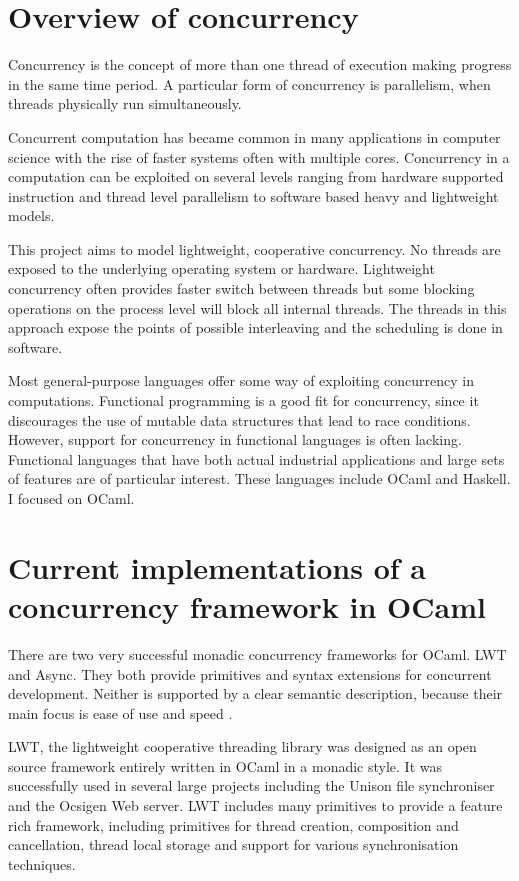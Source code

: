 \documentclass[12pt,twoside,notitlepage]{report}
\theoremstyle{plain}%
\theoremstyle{definition}
\theoremstyle{remark}
\begin{document}
\section{Overview of concurrency}
Concurrency is the concept of more than one thread of execution making progress in the same time period. A particular form of concurrency is parallelism, when threads physically run simultaneously.

Concurrent computation has became common in many applications in computer science with the rise of faster systems often with multiple cores. Concurrency in a computation can be exploited on several levels ranging from hardware supported instruction and thread level parallelism to software based heavy and lightweight models. 

This project aims to model lightweight, cooperative concurrency. No threads are exposed to the underlying operating system or hardware. Lightweight concurrency often provides faster switch between threads  but some blocking operations on the process level will block all internal threads. The threads in this approach expose the points of possible interleaving and the scheduling is done in software.

Most general-purpose languages offer some way of exploiting concurrency in computations. Functional programming is a good fit for concurrency, since it discourages the use of mutable data structures that lead to race conditions.  However, support for concurrency in functional languages is often lacking. Functional languages that have both actual industrial applications and large sets of features are of particular interest. These languages include OCaml and Haskell. I focused on OCaml. 
 

\section{Current implementations of a concurrency framework in OCaml}
There are two very successful monadic concurrency frameworks for OCaml. LWT\cite{LWT} and Async\cite{Async}. They both provide primitives and syntax extensions for concurrent development. Neither is supported by a clear semantic description, because their main focus is ease of use and speed . 

LWT, the lightweight cooperative threading library\cite{vouillon2008lwt} was designed as an open source framework entirely written in OCaml in a monadic style. It was successfully used in several large projects including the Unison file synchroniser and the Ocsigen Web server. LWT includes many primitives to provide a feature rich framework, including primitives for thread creation, composition and cancellation, thread local storage and support for various synchronisation techniques. 
\end{document}
